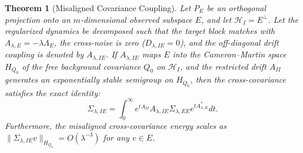 \documentclass[11pt]{amsart}
\theoremstyle{plain}
\newtheorem{theorem}{Theorem}
\theoremstyle{definition}
\theoremstyle{remark}
\begin{document}
\begin{theorem}[Misaligned Covariance Coupling]
  \label{thm:misaligned_coupling}
  Let $P_E$ be an orthogonal projection onto an $m$-dimensional observed subspace $E$, and let $\mathcal{H}_I = E^\perp$. Let the regularized dynamics be decomposed such that the target block matches  with $A_{\lambda,E} = -\lambda \Lambda_E$, the cross-noise is zero ($D_{\lambda,IE} = 0$), and the off-diagonal drift coupling is denoted by $A_{\lambda,IE}$. 
  If $A_{\lambda,IE}$ maps $E$ into the Cameron--Martin space $H_{Q_0}$ of the free background covariance $Q_0$ on $\mathcal{H}_I$, and the restricted drift $A_{II}$ generates an exponentially stable semigroup on $H_{Q_0}$, then the cross-covariance satisfies the exact identity:
  \begin{equation}
    \label{eq:misaligned_resolvent_identity}
    \Sigma_{\lambda,IE} = \int_0^\infty e^{t A_{II}} A_{\lambda,IE} \Sigma_{\lambda,EE} e^{t A_{\lambda,E}^*} dt.
  \end{equation}
  Furthermore, the misaligned cross-covariance energy scales as $\|\Sigma_{\lambda,IE} v\|_{H_{Q_0}} = O(\lambda^{-3})$ for any $v \in E$.
\end{theorem}
\end{document}
